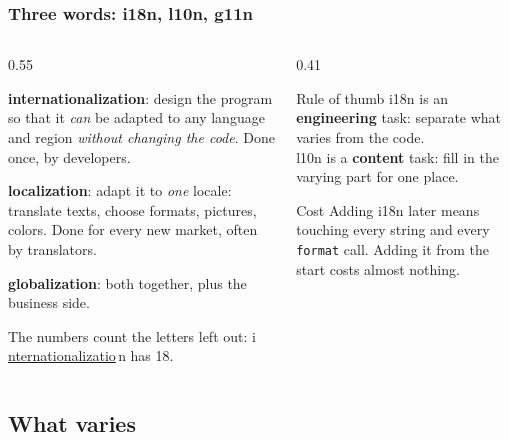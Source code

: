 \documentclass[aspectratio=169,10pt,compress]{beamer}
\begin{document}
\begin{frame}[t,fragile] \frametitle{Three words: i18n, l10n, g11n}
  \begin{columns}[T]
    \begin{column}{0.55\textwidth}
      \begin{description}\small
        \item[i18n] \textbf{internationalization}: design the program so that it \emph{can} be adapted
          to any language and region \emph{without changing the code}. Done once, by developers.
        \item[l10n] \textbf{localization}: adapt it to \emph{one} locale: translate texts, choose formats,
          pictures, colors. Done for every new market, often by translators.
        \item[g11n] \textbf{globalization}: both together, plus the business side.
      \end{description}
      \small The numbers count the letters left out: i\,\underline{nternationalizatio}\,n has 18.
    \end{column}
    \begin{column}{0.41\textwidth}
      \begin{block}{Rule of thumb}
        \small
        i18n is an \textbf{engineering} task: separate what varies from the code.\\[0.3em]
        l10n is a \textbf{content} task: fill in the varying part for one place.
      \end{block}
      \begin{block}{Cost}
        \small Adding i18n later means touching every string and every \texttt{format} call.
        Adding it from the start costs almost nothing.
      \end{block}
    \end{column}
  \end{columns}
\end{frame}

\subsection[What varies]{What varies}
\end{document}
